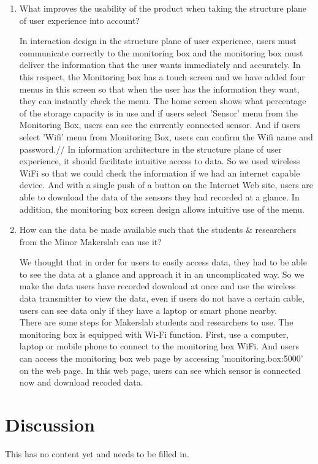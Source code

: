 \documentclass[conference]{IEEEtran}
\begin{document}
\begin{enumerate}
\item What improves the usability of the product when taking the structure plane of user experience into account?

In interaction design in the structure plane of user experience, users must communicate correctly to the monitoring box and the monitoring box must deliver the information that the user wants immediately and accurately. In this respect, the Monitoring box has a touch screen and we have added four menus in this screen so that when the user has the information they want, they can instantly check the menu. The home screen shows what percentage of the storage capacity is in use and if users select 'Sensor' menu from the Monitoring Box, users can see the currently connected sensor. And if users select 'Wifi' menu from Monitoring Box, users can confirm the Wifi name and password.//
In information architecture in the structure plane of user experience, it should facilitate intuitive access to data. So we used wireless WiFi so that we could check the information if we had an internet capable device. And with a single push of a button on the Internet Web site, users are able to download the data of the sensors they had recorded at a glance. In addition, the monitoring box screen design allows intuitive use of the menu.


\item How can the data be made available such that the students \& researchers from the Minor Makerslab can use it?

We thought that in order for users to easily access data, they had to be able to see the data at a glance and approach it in an uncomplicated way. So we make the data users have recorded download at once and use the wireless data transmitter to view the data, even if users do not have a certain cable, users can see data only if they have a laptop or smart phone nearby. \\
There are some steps for Makerslab students and researchers to use. The monitoring box is equipped with Wi-Fi function. First, use a computer, laptop or mobile phone to connect to the monitoring box WiFi. And users can access the monitoring box web page by accessing 'monitoring.box:5000' on the web page. In this web page, users can see which sensor is connected now and download recoded data. 
\end{enumerate}

\section{Discussion}
This has no content yet and needs to be filled in. 
\end{document}
